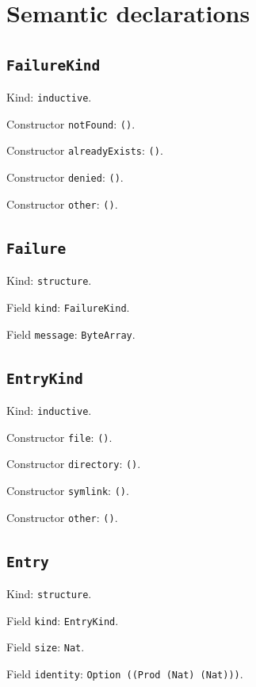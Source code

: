 \documentclass[11pt]{article}
\begin{document}
\section*{Semantic declarations}
\subsection*{\texttt{FailureKind}}
\noindent Kind: \texttt{inductive}.\par
\noindent Constructor \texttt{notFound}: \texttt{()}.\par
\noindent Constructor \texttt{alreadyExists}: \texttt{()}.\par
\noindent Constructor \texttt{denied}: \texttt{()}.\par
\noindent Constructor \texttt{other}: \texttt{()}.\par
\subsection*{\texttt{Failure}}
\noindent Kind: \texttt{structure}.\par
\noindent Field \texttt{kind}: \texttt{FailureKind}.\par
\noindent Field \texttt{message}: \texttt{ByteArray}.\par
\subsection*{\texttt{EntryKind}}
\noindent Kind: \texttt{inductive}.\par
\noindent Constructor \texttt{file}: \texttt{()}.\par
\noindent Constructor \texttt{directory}: \texttt{()}.\par
\noindent Constructor \texttt{symlink}: \texttt{()}.\par
\noindent Constructor \texttt{other}: \texttt{()}.\par
\subsection*{\texttt{Entry}}
\noindent Kind: \texttt{structure}.\par
\noindent Field \texttt{kind}: \texttt{EntryKind}.\par
\noindent Field \texttt{size}: \texttt{Nat}.\par
\noindent Field \texttt{identity}: \texttt{Option ((Prod (Nat) (Nat)))}.\par
\end{document}
